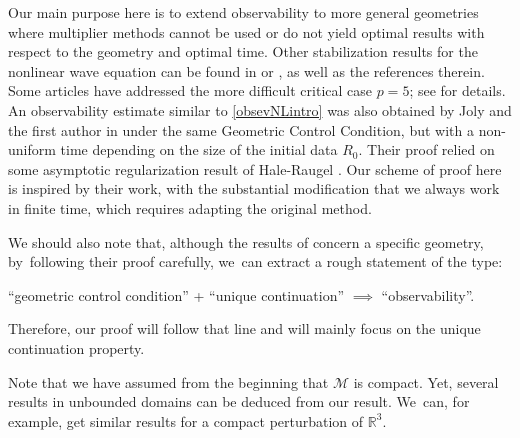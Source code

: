 \documentclass[10pt]{amsart}
\theoremstyle{definition}
\let\mc\mathcal
\newcommand{\M}{\mc{M}}
\newcommand{\R}{\mathbb{R}}
\begin{document}
Our main purpose here is to extend observability to more general geometries where multiplier methods cannot be used or do not yield optimal results with respect to the geometry and optimal time. Other stabilization results for the nonlinear wave equation can be found in \cite{AIN:11} or \cite{Per26}, as well as the references therein. Some articles have addressed the more difficult critical case $p=5$; see \cite{L:11} for details. An observability estimate similar to \eqref{obsevNLintro} was also obtained by Joly and the first author in \cite{JL13} under the same Geometric Control Condition, but with a non-uniform time depending on the size of the initial data $R_0$. Their proof relied on some asymptotic regularization result of Hale-Raugel \cite{HR03}. Our scheme of proof here is inspired by their work, with the substantial modification that we always work in finite time, which requires adapting the original method.

We should also note that, although the results of \cite{DLZ03} concern a specific geometry, by~following their proof carefully, we~can extract a rough statement of the type:
\begin{center}
``geometric control condition'' + ``unique continuation'' $\implies$ ``observability''.
\end{center}
Therefore, our proof will follow that line and will mainly focus on the unique continuation property.

Note that we have assumed from the beginning that $\M$ is compact. Yet, several results in unbounded domains can be deduced from our result. We~can, for example, get similar results for a compact perturbation of $\R^3$.
\end{document}
